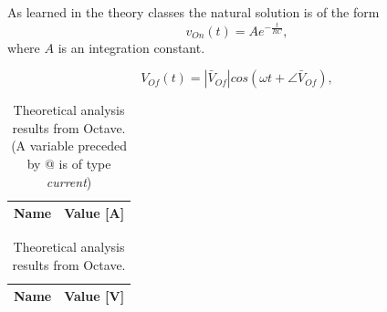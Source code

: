 As learned in the theory classes the natural solution is of the form
\begin{equation}
  v_{On}(t) = Ae^{-\frac{t}{RC}},
  \label{eq:vo_nat}
\end{equation}
where $A$ is an integration constant.

\begin{equation}
  V_{Of}(t) = |\bar{V}_{Of}| cos(\omega t + \angle \bar{V}_{Of}),
  \label{eq:vo_for}
\end{equation}


\begin{table}[h]
  \centering
  \begin{tabular}{|l|r|}
    \hline    
    {\bf Name} & {\bf Value [A]} \\ \hline
     
  \end{tabular}
  \caption{Theoretical analysis results from Octave. (A variable preceded by @ is of type {\em current})}
  \label{tab:mesh}
\end{table}

\begin{table}[h]
  \centering
  \begin{tabular}{|l|r|}
    \hline    
    {\bf Name} & {\bf Value [V]} \\ \hline
     
  \end{tabular}
  \caption{Theoretical analysis results from Octave.}
  \label{tab:node}
\end{table}
